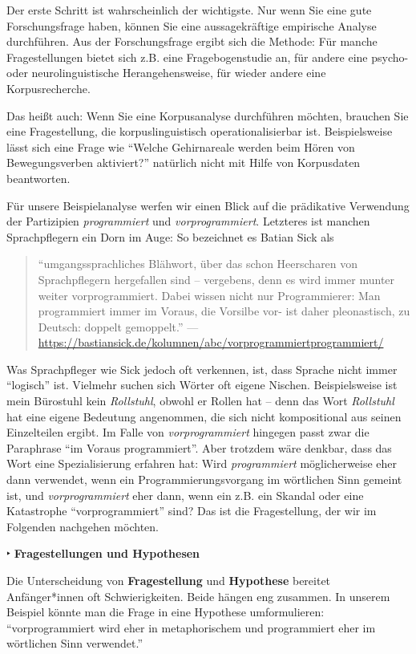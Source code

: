 \documentclass[]{article}
\begin{document}
Der erste Schritt ist wahrscheinlich der wichtigste. Nur wenn Sie eine
gute Forschungsfrage haben, können Sie eine aussagekräftige empirische
Analyse durchführen. Aus der Forschungsfrage ergibt sich die Methode:
Für manche Fragestellungen bietet sich z.B. eine Fragebogenstudie an,
für andere eine psycho- oder neurolinguistische Herangehensweise, für
wieder andere eine Korpusrecherche.

Das heißt auch: Wenn Sie eine Korpusanalyse durchführen möchten,
brauchen Sie eine Fragestellung, die korpuslinguistisch
operationalisierbar ist. Beispielsweise lässt sich eine Frage wie
\enquote{Welche Gehirnareale werden beim Hören von Bewegungsverben
aktiviert?} natürlich nicht mit Hilfe von Korpusdaten beantworten.

Für unsere Beispielanalyse werfen wir einen Blick auf die prädikative
Verwendung der Partizipien \emph{programmiert} und
\emph{vorprogrammiert}. Letzteres ist manchen Sprachpflegern ein Dorn im
Auge: So bezeichnet es Batian Sick als

\begin{quote}
\enquote{umgangssprachliches Blähwort, über das schon Heerscharen von
Sprachpflegern hergefallen sind -- vergebens, denn es wird immer munter
weiter vorprogrammiert. Dabei wissen nicht nur Programmierer: Man
programmiert immer im Voraus, die Vorsilbe vor- ist daher pleonastisch,
zu Deutsch: doppelt gemoppelt.} \hfill ---
\url{https://bastiansick.de/kolumnen/abc/vorprogrammiertprogrammiert/}
\end{quote}

Was Sprachpfleger wie Sick jedoch oft verkennen, ist, dass Sprache nicht
immer \enquote{logisch} ist. Vielmehr suchen sich Wörter oft eigene
Nischen. Beispielsweise ist mein Bürostuhl kein \emph{Rollstuhl}, obwohl
er Rollen hat -- denn das Wort \emph{Rollstuhl} hat eine eigene
Bedeutung angenommen, die sich nicht kompositional aus seinen
Einzelteilen ergibt. Im Falle von \emph{vorprogrammiert} hingegen passt
zwar die Paraphrase \enquote{im Voraus programmiert}. Aber trotzdem wäre
denkbar, dass das Wort eine Spezialisierung erfahren hat: Wird
\emph{programmiert} möglicherweise eher dann verwendet, wenn ein
Programmierungsvorgang im wörtlichen Sinn gemeint ist, und
\emph{vorprogrammiert} eher dann, wenn ein z.B. ein Skandal oder eine
Katastrophe \enquote{vorprogrammiert} sind? Das ist die Fragestellung,
der wir im Folgenden nachgehen möchten.

 ‣ \textbf{Fragestellungen und Hypothesen}

Die Unterscheidung von \textbf{Fragestellung} und \textbf{Hypothese}
bereitet Anfänger*innen oft Schwierigkeiten. Beide hängen eng zusammen.
In unserem Beispiel könnte man die Frage in eine Hypothese
umformulieren: \enquote{vorprogrammiert wird eher in metaphorischem und
programmiert eher im wörtlichen Sinn verwendet.}
\end{document}
